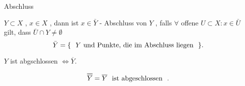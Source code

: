 \documentclass[class=article, crop=false]{standalone}
\begin{document}
\begin{zettel}{Abschluss}
\begin{flashcard}
    \begin{definition}[Abschluss]
        $Y \subset X$ , $x \in  X$ , dann ist $x \in  \bar{Y} $ - Abschluss von $Y$ , falls  $\forall $ offene $U \subset X : x \in  \bar{U} $ gilt, dass $ \bar{U} \cap Y \neq  \emptyset$ 
        \[
            \bar{Y} =  \set{ \tx{ $Y$ und Punkte, die im Abschluss liegen } }
        .\]
    \end{definition}
\end{flashcard}
\begin{lemma}
    $Y$ ist abgschlossen $\iff \overline{Y} $.
\end{lemma}

\begin{corollary}
    \[
        \overline{\overline{Y}} = \overline{Y} \tx{ ist abgeschlossen } 
    .\]
\end{corollary}
\end{zettel}
\end{document}
